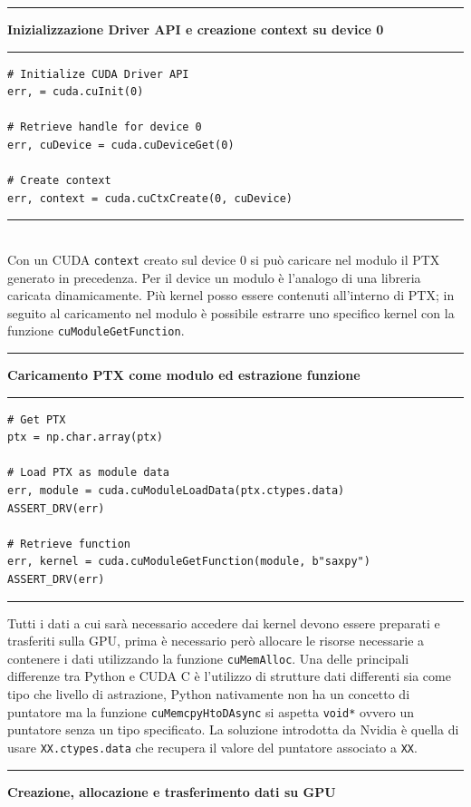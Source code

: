 \documentclass[12pt,a4paper]{report}
\begin{document}
\noindent\rule[0.5ex]{\linewidth}{2pt}
\small{\textbf{Inizializzazione Driver API e creazione context su device 0}} \\
\noindent\rule[0.5ex]{\linewidth}{1pt}
\begin{lstlisting}
# Initialize CUDA Driver API
err, = cuda.cuInit(0)

# Retrieve handle for device 0
err, cuDevice = cuda.cuDeviceGet(0)

# Create context
err, context = cuda.cuCtxCreate(0, cuDevice)
\end{lstlisting}
\noindent\rule[0.5ex]{\linewidth}{1pt} \\[10pt]
Con un CUDA \verb|context| creato sul device 0 si può caricare nel modulo il PTX generato in precedenza. Per il device un modulo è l'analogo di una libreria caricata dinamicamente. Più kernel posso essere contenuti all'interno di PTX; in seguito al caricamento nel modulo è possibile estrarre uno specifico kernel con la funzione \verb|cuModuleGetFunction|. \\[10pt]
\noindent\rule[0.5ex]{\linewidth}{2pt}
\small{\textbf{Caricamento PTX come modulo ed estrazione funzione}} \\
\noindent\rule[0.5ex]{\linewidth}{1pt}
\begin{lstlisting}
# Get PTX
ptx = np.char.array(ptx)

# Load PTX as module data
err, module = cuda.cuModuleLoadData(ptx.ctypes.data)
ASSERT_DRV(err)

# Retrieve function
err, kernel = cuda.cuModuleGetFunction(module, b"saxpy")
ASSERT_DRV(err)
\end{lstlisting}
\noindent\rule[0.5ex]{\linewidth}{1pt} \newpage
Tutti i dati a cui sarà necessario accedere dai kernel devono essere preparati e trasferiti sulla GPU, prima è necessario però allocare le risorse necessarie a contenere i dati utilizzando la funzione \verb|cuMemAlloc|. \newline
Una delle principali differenze tra Python e CUDA C è l'utilizzo di strutture dati differenti sia come tipo che livello di astrazione, Python nativamente non ha un concetto di puntatore ma la funzione \verb|cuMemcpyHtoDAsync| si aspetta \verb|void*| ovvero un puntatore senza un tipo specificato. La soluzione introdotta da Nvidia è quella di usare \verb|XX.ctypes.data| che recupera il valore del puntatore associato a \verb|XX|. \\[10pt]
\noindent\rule[0.5ex]{\linewidth}{2pt}
\small{\textbf{Creazione, allocazione e trasferimento dati su GPU}} \\
\end{document}
